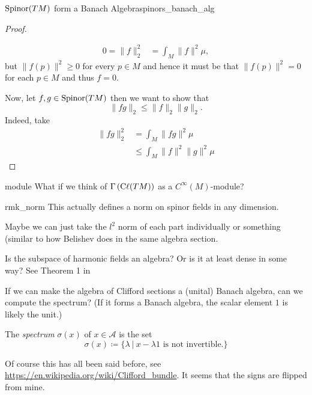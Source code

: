 \begin{prop}{$\mathrm{Spinor}(TM)$ form a Banach Algebra}{spinors_banach_alg}
\begin{proof}
\begin{enumerate}[(i)]
    \begin{align*}
        0=\|f\|_2^2 &= \int_M \|f\|^2 \mu,
    \end{align*}
    but $\|f(p)\|^2\geq 0$ for every $p\in M$ and hence it must be that $\|f(p)\|^2 = 0$ for each $p\in M$ and thus $f=0$.
\end{enumerate}
Now, let $f,g \in \mathrm{Spinor}(TM)$ then we want to show that
\[
\|fg\|_2\leq \|f\|_2\|g\|_2.
\]
Indeed, take
\begin{align*}
    \|fg\|_2^2 &= \int_M \|fg\|^2 \mu\\
    &\leq \int_M \|f\|^2\|g\|^2 \mu
\end{align*}
\end{proof}
\end{prop}



\begin{remark}{}{module}
What if we think of $\Gamma\left(\mathrm{C}\ell(TM)\right)$ as a $C^\infty(M)$-module?
\end{remark}

\begin{remark}{}{rmk_norm}
This actually defines a norm on spinor fields in any dimension.
\end{remark}



Maybe we can just take the $l^2$ norm of each part individually or something (similar to how Belishev does in the same algebra section.

\begin{question}
Is the subspace of harmonic fields an algebra? Or is it at least dense in some way? See Theorem 1 in \cite{belishev_quaternion}
\end{question}




\begin{question}
If we can make the algebra of Clifford sections a (unital) Banach algebra, can we compute the spectrum? (If it forms a Banach algebra, the scalar element $1$ is likely the unit.)
\end{question}

\begin{definition}
The \emph{spectrum} $\sigma(x)$ of $x\in \mathcal{A}$ is the set
\[
\sigma(x) \coloneqq \{ \lambda ~\vert~ x-\lambda 1 \textrm{ is not invertible.}\}
\]
\end{definition}

Of course this has all been said before, see \url{https://en.wikipedia.org/wiki/Clifford_bundle}. It seems that the signs are flipped from mine.

